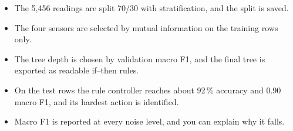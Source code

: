 \begin{verification}
\begin{itemize}
  \item The 5,456 readings are split 70/30 with stratification, and the split is saved.
  \item The four sensors are selected by mutual information on the training rows only.
  \item The tree depth is chosen by validation macro F1, and the final tree is exported as readable if--then rules.
  \item On the test rows the rule controller reaches about 92\,\% accuracy and 0.90 macro F1, and its hardest action is identified.
  \item Macro F1 is reported at every noise level, and you can explain why it falls.
\end{itemize}
\end{verification}
